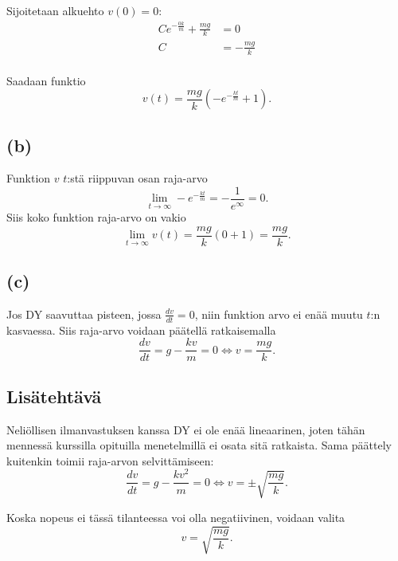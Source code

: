 \documentclass{article}
\begin{document}
Sijoitetaan alkuehto $v(0) = 0$:
\begin{align*}
  Ce^{-\frac{0k}{m}} + \frac{mg}{k} &= 0 \\
  C &= -\frac{mg}{k} \\
\end{align*}

Saadaan funktio
\[
  v(t) = \frac{mg}{k}(-e^{-\frac{kt}{m}} + 1).
\]

\subsection*{(b)}

Funktion $v$ $t$:stä riippuvan osan raja-arvo
\[
  \lim_{t \rightarrow \infty} -e^{-\frac{kt}{m}} = -\frac{1}{e^{\infty}} = 0.
\]
Siis koko funktion raja-arvo on vakio
\[
  \lim_{t \rightarrow \infty} v(t) = \frac{mg}{k}(0 + 1) = \frac{mg}{k}.
\]

\subsection*{(c)}

Jos DY saavuttaa pisteen, jossa $\frac{dv}{dt} = 0$, niin funktion arvo ei enää
muutu $t$:n kasvaessa. Siis raja-arvo voidaan päätellä ratkaisemalla
\[
  \frac{dv}{dt} = g - \frac{kv}{m} = 0 \iff v = \frac{mg}{k}.
\]

\subsection*{Lisätehtävä}

Neliöllisen ilmanvastuksen kanssa DY ei ole enää lineaarinen, joten tähän
mennessä kurssilla opituil\-la menetel\-millä ei osata sitä ratkaista. Sama
päättely kuitenkin toimii raja-arvon selvittämiseen:
\[
  \frac{dv}{dt} = g - \frac{kv^2}{m} = 0 \iff v = \pm \sqrt{\frac{mg}{k}}.
\]

Koska nopeus ei tässä tilanteessa voi olla negatiivinen, voidaan valita
\[
  v = \sqrt{\frac{mg}{k}}.
\]
\end{document}
